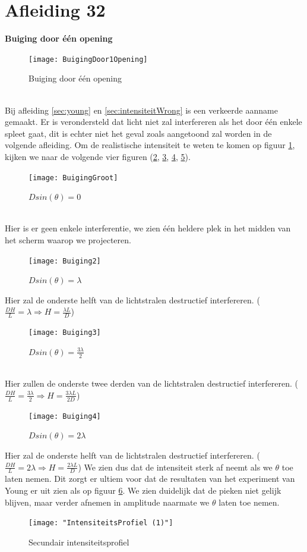 \documentclass[a4paper,kul]{kulakarticle} %
\begin{document}
\section{Afleiding 32}
\label{sec:RealiteitBuiging}
\textbf{Buiging door één opening}\\
\begin{figure}[!h]
	\centering
	\texttt{[image: BuigingDoor1Opening]}
	\caption[Buiging door 1 opening]{Buiging door één opening}
	\label{fig:buigingdoor1opening}
\end{figure} \\
Bij afleiding \ref{sec:young} en \ref{sec:intensiteitWrong} is een verkeerde aanname gemaakt. Er is verondersteld dat licht niet zal interfereren als het door één enkele spleet gaat, dit is echter niet het geval zoals aangetoond zal worden in de volgende afleiding. Om de realistische intensiteit te weten te komen op figuur \ref{fig:buigingdoor1opening}, kijken we naar de volgende vier figuren (\ref{fig:buiging1}, \ref{fig:buiging2}, \ref{fig:buiging3}, \ref{fig:buiging4}). 
\begin{figure}[!h]
	\centering
	\texttt{[image: BuigingGroot]}
	\caption[Buiging 1]{$Dsin(\theta)=0$}
	\label{fig:buiging1}
\end{figure}\\
Hier is er geen enkele interferentie, we zien één heldere plek in het midden van het scherm waarop we projecteren.
\newpage
\begin{figure}[!h]
	\centering
	\texttt{[image: Buiging2]}
	\caption[Buiging 2]{$Dsin(\theta)=\lambda$}
	\label{fig:buiging2}
\end{figure}
Hier zal de onderste helft van de lichtstralen destructief interfereren. ($ \frac{DH}{L}=\lambda\Rightarrow H=\frac{\lambda L}{D}$)
\begin{figure}[!h]
	\centering
	\texttt{[image: Buiging3]}
	\caption[Buiging 3]{$Dsin(\theta)=\frac{3\lambda}{2}$}
	\label{fig:buiging3}
\end{figure}\\
Hier zullen de onderste twee derden van de lichtstralen destructief interfereren. ($ \frac{DH}{L}=\frac{3\lambda}{2}\Rightarrow H=\frac{3\lambda L}{2D}$)
\newpage
\begin{figure}[!h]
	\centering
	\texttt{[image: Buiging4]}
	\caption[Buiging 4]{$Dsin(\theta)=2\lambda$}
	\label{fig:buiging4}
\end{figure}
Hier zal de onderste helft van de lichtstralen destructief interfereren. ($ \frac{DH}{L}=2\lambda\Rightarrow H=\frac{2\lambda L}{D}$)
\newline
We zien dus dat de intensiteit sterk af neemt als we $\theta$ toe laten nemen. Dit zorgt er ultiem voor dat de resultaten van het experiment van Young er uit zien als op figuur \ref{fig:intensiteitsprofiel-1}. We zien duidelijk dat de pieken niet gelijk blijven, maar verder afnemen in amplitude naarmate we $\theta$ laten toe nemen. 
\begin{figure}[!h]
	\centering
	\texttt{[image: "IntensiteitsProfiel (1)"]}
	\caption[Intensiteitsprofiel]{Secundair intensiteitsprofiel}
	\label{fig:intensiteitsprofiel-1}
\end{figure}
\newpage
\end{document}
